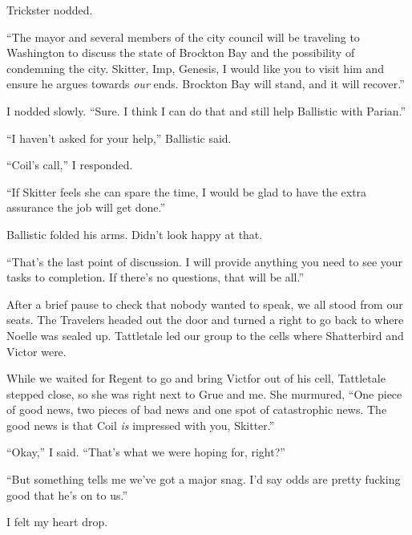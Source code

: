 Trickster nodded.



``The mayor and several members of the city council will be traveling to Washington to discuss the state of Brockton Bay and the possibility of condemning the city.  Skitter, Imp, Genesis, I would like you to visit him and ensure he argues towards \emph{our} ends.  Brockton Bay will stand, and it will recover.''



I nodded slowly.  ``Sure.  I think I can do that and still help Ballistic with Parian.''



``I haven't asked for your help,'' Ballistic said.



``Coil's call,'' I responded.



``If Skitter feels she can spare the time, I would be glad to have the extra assurance the job will get done.''



Ballistic folded his arms.  Didn't look happy at that.



``That's the last point of discussion.  I will provide anything you need to see your tasks to completion.  If there's no questions, that will be all.''



After a brief pause to check that nobody wanted to speak, we all stood from our seats.  The Travelers headed out the door and turned a right to go back to where Noelle was sealed up.  Tattletale led our group to the cells where Shatterbird and Victor were.



While we waited for Regent to go and bring Victfor out of his cell, Tattletale stepped close, so she was right next to Grue and me.  She murmured,  ``One piece of good news, two pieces of bad news and one spot of catastrophic news.  The good news is that Coil \emph{is} impressed with you, Skitter.''



``Okay,'' I said.  ``That's what we were hoping for, right?''



``But something tells me we've got a major snag.  I'd say odds are pretty fucking good that he's on to us.''



I felt my heart drop.



